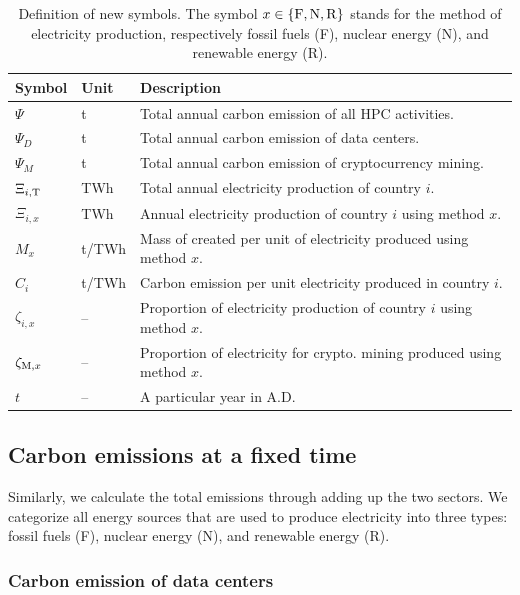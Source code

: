 \documentclass[12pt]{article}
\begin{document}
\begin{table}[t]
	\centering
	\caption{Definition of new symbols. The symbol $x \in \left\{ \rm F, N, R \right\}$ stands for the method of electricity production, respectively fossil fuels (F), nuclear energy (N), and renewable energy (R).}
	\label{table_symbols_q2}
	\begin{tabular}{lll}
		\hline
		\textbf{Symbol} & \textbf{Unit} & \textbf{Description} \\
		\hline
		$\Psi$ & t & Total annual carbon emission of all HPC activities. \\
		$\Psi_D$ & t & Total annual carbon emission of data centers. \\
		$\Psi_M$ & t & Total annual carbon emission of cryptocurrency mining. \\
		$\Xi_{i,\rm T}$ & TWh & Total annual electricity production of country $i$. \\
		$\Xi_{i,x}$ & TWh & Annual electricity production of country $i$ using method $x$. \\
		$M_{x}$ & t/TWh & Mass of \ce{CO2} created per unit of electricity produced using method $x$. \\
		$C_{i}$ & t/TWh & Carbon emission per unit electricity produced in country $i$. \\
		$\zeta_{i,x}$ & -- & Proportion of electricity production of country $i$ using method $x$. \\
		$\zeta_{{\rm M},x}$ & -- & Proportion of electricity for crypto. mining produced using method $x$. \\
		$t$ & -- & A particular year in A.D. \\
		\hline
	\end{tabular}
\end{table}

\subsection{Carbon emissions at a fixed time}

Similarly, we calculate the total emissions through adding up the two sectors. We categorize all energy sources that are used to produce electricity into three types: fossil fuels (F), nuclear energy (N), and renewable energy (R).

\subsubsection{Carbon emission of data centers}
\end{document}
